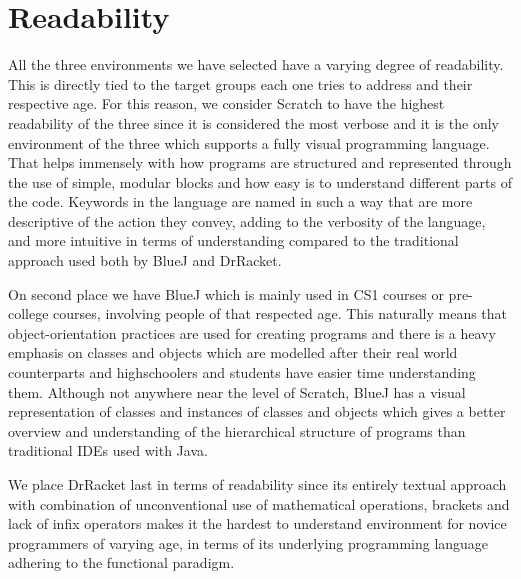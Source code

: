 \section{Readability}
\label{sec:readability}
All the three environments we have selected have a varying degree of readability. This is directly tied to the target groups each one tries to address and their respective age. For this reason, we consider Scratch to have the highest readability of the three since it is considered the most verbose and it is the only environment of the three which supports a fully visual programming language. That helps immensely with how programs are structured and represented through the use of simple, modular blocks and how easy is to understand different parts of the code. Keywords in the language are named in such a way that are more descriptive of the action they convey, adding to the verbosity of the language, and more intuitive in terms of understanding compared to the traditional approach used both by BlueJ and DrRacket. 

On second place we have BlueJ which is mainly used in CS1 courses or pre-college courses, involving people of that respected age. This naturally means that object-orientation practices are used for creating programs and there is a heavy emphasis on classes and objects which are modelled after their real world counterparts and highschoolers and students have easier time understanding them. Although not anywhere near the level of Scratch, BlueJ has a visual representation of classes and instances of classes and objects which gives a better overview and understanding of the hierarchical structure of programs than traditional IDEs used with Java. 

We place DrRacket last in terms of readability since its entirely textual approach with combination of unconventional use of mathematical operations, brackets and lack of infix operators makes it the hardest to understand environment for novice programmers of varying age, in terms of its underlying programming language adhering to the functional paradigm.

